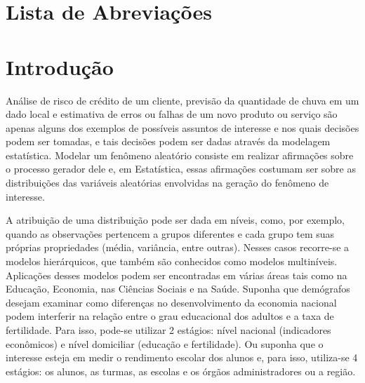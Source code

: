 \documentclass[12pt,a4paper,header]{abnt}
\begin{document}
\tableofcontents{}
\listoffigures


\newpage
\chapter*{Lista de Abreviações}
\begin{acronym}
\end{acronym}


\newpage \thispagestyle{empty} %




\chapter{Introdução} \label{cap:introducao}

Análise de risco de crédito de um cliente, previsão da quantidade de chuva em um dado local e estimativa de erros ou falhas de um novo produto ou serviço são apenas alguns dos exemplos de possíveis assuntos de interesse e nos quais decisões podem ser tomadas, e tais decisões podem ser dadas através da modelagem estatística. Modelar um fenômeno aleatório consiste em realizar afirmações sobre o processo gerador dele e, em Estatística, essas afirmações costumam ser sobre as distribuições das variáveis aleatórias envolvidas na geração do fenômeno de interesse.

A atribuição de uma distribuição pode ser dada em níveis, como, por exemplo, quando as observações pertencem a grupos diferentes e cada grupo tem suas próprias propriedades (média, variância, entre outras). Nesses casos recorre-se a modelos hierárquicos, que também são conhecidos como modelos multiníveis. Aplicações desses modelos podem ser encontradas em várias áreas tais como na Educação, Economia, nas Ciências Sociais e na Saúde. Suponha que demógrafos desejam examinar como diferenças no desenvolvimento da economia nacional podem interferir na relação entre o grau educacional dos adultos e a taxa de fertilidade. Para isso, pode-se utilizar 2 estágios: nível nacional (indicadores econômicos) e nível domiciliar (educação e fertilidade). Ou suponha que o interesse esteja em medir o rendimento escolar dos alunos e, para isso, utiliza-se 4 estágios: os alunos, as turmas, as escolas e os órgãos administradores ou a região.
\end{document}
